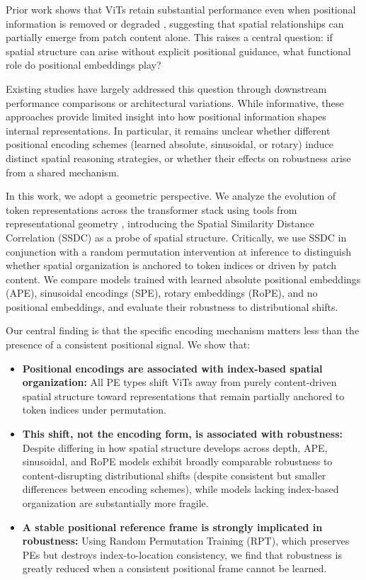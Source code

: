 \documentclass{article}
\begin{document}
Prior work shows that ViTs retain substantial performance even when positional information is removed or degraded \citep{dosovitskiy2021an, chu2023conditional}, suggesting that spatial relationships can partially emerge from patch content alone. This raises a central question: if spatial structure can arise without explicit positional guidance, what functional role do positional embeddings play?

Existing studies have largely addressed this question through downstream performance comparisons or architectural variations. While informative, these approaches provide limited insight into how positional information shapes internal representations. In particular, it remains unclear whether different positional encoding schemes (learned absolute, sinusoidal, or rotary) induce distinct spatial reasoning strategies, or whether their effects on robustness arise from a shared mechanism.

In this work, we adopt a geometric perspective. We analyze the evolution of token representations across the transformer stack using tools from representational geometry \citep{raghu2021do}, introducing the Spatial Similarity Distance Correlation (SSDC) as a probe of spatial structure. Critically, we use SSDC in conjunction with a random permutation intervention at inference to distinguish whether spatial organization is anchored to token indices or driven by patch content. We compare models trained with learned absolute positional embeddings (APE), sinusoidal encodings (SPE), rotary embeddings (RoPE), and no positional embeddings, and evaluate their robustness to distributional shifts.

Our central finding is that the specific encoding mechanism matters less than the presence of a consistent positional signal. We show that:
\begin{itemize}
    \item \textbf{Positional encodings are associated with index-based spatial organization:} All PE types shift ViTs away from purely content-driven spatial structure toward representations that remain partially anchored to token indices under permutation.
    \item \textbf{This shift, not the encoding form, is associated with robustness:} Despite differing in how spatial structure develops across depth, APE, sinusoidal, and RoPE models exhibit broadly comparable robustness to content-disrupting distributional shifts (despite consistent but smaller differences between encoding schemes), while models lacking index-based organization are substantially more fragile.
    \item \textbf{A stable positional reference frame is strongly implicated in robustness:} Using Random Permutation Training (RPT), which preserves PEs but destroys index-to-location consistency, we find that robustness is greatly reduced when a consistent positional frame cannot be learned.
\end{itemize}
\end{document}
